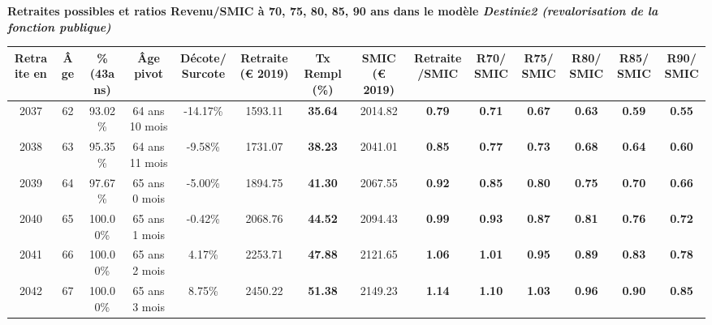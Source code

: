  \vspace{0.1cm} 
{\bf \noindent Retraites possibles et ratios Revenu/SMIC à 70, 75, 80, 85, 90 ans dans le modèle \emph{Destinie2 (revalorisation de la fonction publique)}}  
 
\begin{adjustbox}{max width=\textwidth} 
\begin{tabular}[htb]{|c|c||c|c|c||c|c||c|c||c|c|c|c|c|} 
\hline 
 Retraite en &  Âge &  \%(43ans) &  Âge pivot &  Décote/Surcote &  Retraite (\euro{} 2019) &  Tx Rempl(\%) &  SMIC (\euro{} 2019) &  Retraite/SMIC &  R70/SMIC &  R75/SMIC &  R80/SMIC &  R85/SMIC &  R90/SMIC \\ 
\hline \hline 
 2037 &  62 &  93.02\% &  64 ans 10 mois &  -14.17\% &  1593.11 &  {\bf 35.64} &  2014.82 &  {\bf {\color{red} 0.79}} &  {\bf {\color{red} 0.71}} &  {\bf {\color{red} 0.67}} &  {\bf {\color{red} 0.63}} &  {\bf {\color{red} 0.59}} &  {\bf {\color{red} 0.55}} \\ 
\hline 
 2038 &  63 &  95.35\% &  64 ans 11 mois &  -9.58\% &  1731.07 &  {\bf 38.23} &  2041.01 &  {\bf {\color{red} 0.85}} &  {\bf {\color{red} 0.77}} &  {\bf {\color{red} 0.73}} &  {\bf {\color{red} 0.68}} &  {\bf {\color{red} 0.64}} &  {\bf {\color{red} 0.60}} \\ 
\hline 
 2039 &  64 &  97.67\% &  65 ans 0 mois &  -5.00\% &  1894.75 &  {\bf 41.30} &  2067.55 &  {\bf {\color{red} 0.92}} &  {\bf {\color{red} 0.85}} &  {\bf {\color{red} 0.80}} &  {\bf {\color{red} 0.75}} &  {\bf {\color{red} 0.70}} &  {\bf {\color{red} 0.66}} \\ 
\hline 
 2040 &  65 &  100.00\% &  65 ans 1 mois &  -0.42\% &  2068.76 &  {\bf 44.52} &  2094.43 &  {\bf {\color{red} 0.99}} &  {\bf {\color{red} 0.93}} &  {\bf {\color{red} 0.87}} &  {\bf {\color{red} 0.81}} &  {\bf {\color{red} 0.76}} &  {\bf {\color{red} 0.72}} \\ 
\hline 
 2041 &  66 &  100.00\% &  65 ans 2 mois &  4.17\% &  2253.71 &  {\bf 47.88} &  2121.65 &  {\bf 1.06} &  {\bf 1.01} &  {\bf {\color{red} 0.95}} &  {\bf {\color{red} 0.89}} &  {\bf {\color{red} 0.83}} &  {\bf {\color{red} 0.78}} \\ 
\hline 
 2042 &  67 &  100.00\% &  65 ans 3 mois &  8.75\% &  2450.22 &  {\bf 51.38} &  2149.23 &  {\bf 1.14} &  {\bf 1.10} &  {\bf 1.03} &  {\bf {\color{red} 0.96}} &  {\bf {\color{red} 0.90}} &  {\bf {\color{red} 0.85}} \\ 
\hline 
\hline 
\end{tabular} 
\end{adjustbox} 
 
